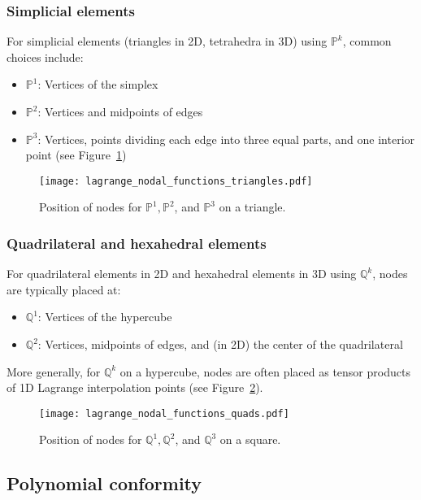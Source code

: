 \subsubsection{Simplicial elements}

For simplicial elements (triangles in 2D, tetrahedra in 3D) using $\mathbb{P}^k$, common choices include:

\begin{itemize}
\item $\mathbb{P}^1$: Vertices of the simplex
\item $\mathbb{P}^2$: Vertices and midpoints of edges
\item $\mathbb{P}^3$: Vertices, points dividing each edge into three equal parts, and one interior point (see Figure~\ref{fig:p_nodes_2d})
\end{itemize}

\begin{figure}[!htb]
\centering
\texttt{[image: lagrange\_nodal\_functions\_triangles.pdf]}
\caption{Position of nodes for $\mathbb{P}^1, \mathbb{P}^2$, and $\mathbb{P}^3$ on a triangle.}
\label{fig:p_nodes_2d}
\end{figure}

\subsubsection{Quadrilateral and hexahedral elements}

For quadrilateral elements in 2D and hexahedral elements in 3D using $\mathbb{Q}^k$, nodes are typically placed at:

\begin{itemize}
\item $\mathbb{Q}^1$: Vertices of the hypercube
\item $\mathbb{Q}^2$: Vertices, midpoints of edges, and (in 2D) the center of the quadrilateral
\end{itemize}

More generally, for $\mathbb{Q}^k$ on a hypercube, nodes are often placed as tensor products of 1D Lagrange interpolation points (see Figure~\ref{fig:q_nodes_2d}).


\begin{figure}[!htb]
  \centering
  \texttt{[image: lagrange\_nodal\_functions\_quads.pdf]}
  \caption{Position of nodes for $\mathbb{Q}^1, \mathbb{Q}^2$, and $\mathbb{Q}^3$ on a square.}
  \label{fig:q_nodes_2d}
  \end{figure}

\subsection{Polynomial conformity}

